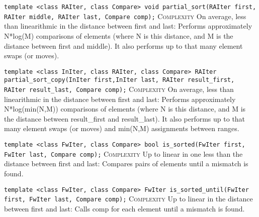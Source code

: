 \noindent{}\hspace*{0.25em}\lstinline[basicstyle=\ttfamily\color{cred}]{template <class RAIter, class Compare> void partial_sort(RAIter first, RAIter middle, RAIter last, Compare comp);} \textsc{Complexity} On average, less than linearithmic in the distance between first and last: Performs approximately N*log(M) comparisons of elements (where N is this distance, and M is the distance between first and middle). It also performs up to that many element swaps (or moves).\\\vspace{-0.6em}

\noindent{}\hspace*{0.25em}\lstinline[basicstyle=\ttfamily\color{cred}]{template <class InIter, class RAIter, class Compare> RAIter partial_sort_copy(InIter first,InIter last, RAIter result_first, RAIter result_last, Compare comp);} \textsc{Complexity} On average, less than linearithmic in the distance between first and last: Performs approximately N*log(min(N,M)) comparisons of elements (where N is this distance, and M is the distance between result\_first and result\_last). It also performs up to that many element swaps (or moves) and min(N,M) assignments between ranges.\\\vspace{-0.6em}

\noindent{}\hspace*{0.25em}\lstinline[basicstyle=\ttfamily\color{corange}]{template <class FwIter, class Compare> bool is_sorted(FwIter first, FwIter last, Compare comp);} \textsc{Complexity} Up to linear in one less than the distance between first and last: Compares pairs of elements until a mismatch is found.\\\vspace{-0.6em}

\noindent{}\hspace*{0.25em}\lstinline[basicstyle=\ttfamily\color{corange}]{template <class FwIter, class Compare> FwIter is_sorted_until(FwIter first, FwIter last, Compare comp);} \textsc{Complexity} Up to linear in the distance between first and last: Calls comp for each element until a mismatch is found.\\\vspace{-0.6em}

